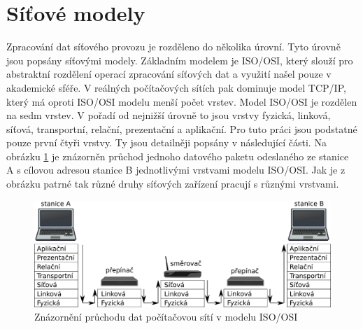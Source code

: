 \section{Síťové modely}\label{section:models} %
Zpracování dat síťového provozu je rozděleno do několika úrovní. Tyto úrovně jsou popsány síťovými modely.
Základním modelem je ISO/OSI, který slouží pro abstraktní rozdělení operací zpracování síťových dat a využití
našel pouze v akademické sféře. V reálných počítačových sítích pak dominuje model TCP/IP, který má oproti
ISO/OSI modelu menší počet vrstev. Model ISO/OSI je rozdělen na sedm vrstev. V pořadí od nejnižší úrovně to
jsou vrstvy fyzická, linková, síťová, transportní, relační, prezentační a aplikační. Pro tuto práci jsou
podstatné pouze první čtyři vrstvy. Ty jsou detailněji popsány v následující části. Na obrázku \ref{fig:layers} je
znázorněn průchod jednoho datového paketu odeslaného ze stanice A s cílovou adresou stanice B jednotlivými vrstvami modelu ISO/OSI. Jak je z obrázku patrné tak různé druhy síťových zařízení pracují s různými vrstvami.

\begin{figure}[!htbp]
	\centering
	\includegraphics[scale=.25]{fig/layers.pdf}
	\caption{Znázornění průchodu dat počítačovou sítí v modelu ISO/OSI}
    \label{fig:layers}
\end{figure}

